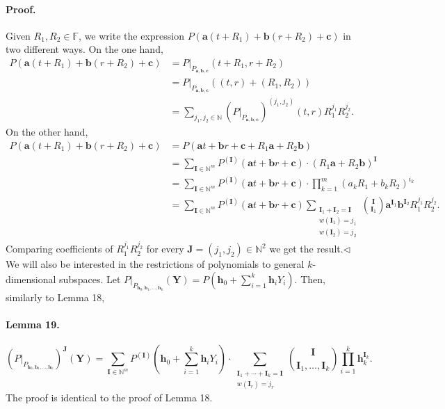 \paragraph{Proof.} Given $R_1,R_2\in\mathbb F$, we write the expression $P(\boldsymbol a(t+R_1)+\boldsymbol b(r+R_2)+\boldsymbol c)$ in two different ways. On the one hand,
\begin{align*}
P(\boldsymbol a(t+R_1)+\boldsymbol b(r+R_2)+\boldsymbol c)
&=P|_{P_{\boldsymbol a,\boldsymbol b,\boldsymbol c}}(t+R_1,r+R_2)\\
&=P|_{P_{\boldsymbol a,\boldsymbol b,\boldsymbol c}}((t,r)+(R_1,R_2))\\
&=\sum_{j_1,j_2\in\mathbb N}(P|_{P_{\boldsymbol a,\boldsymbol b,\boldsymbol c}})^{(j_1,j_2)}(t,r)R_1^{j_1}R_2^{j_2}.
\end{align*}
On the other hand,
\begin{align*}
P(\boldsymbol a(t+R_1)+\boldsymbol b(r+R_2)+\boldsymbol c)
&=P(\boldsymbol at+\boldsymbol br+\boldsymbol c+R_1\boldsymbol a+R_2\boldsymbol b)\\
&=\sum_{\boldsymbol I\in\mathbb N^m}P^{(\boldsymbol I)}(\boldsymbol at+\boldsymbol br+\boldsymbol c)\cdot(R_1\boldsymbol a+R_2\boldsymbol b)^{\boldsymbol I}\\
&=\sum_{\boldsymbol I\in\mathbb N^m}P^{(\boldsymbol I)}(\boldsymbol at+\boldsymbol br+\boldsymbol c)\cdot\prod_{k=1}^m(a_kR_1+b_kR_2)^{i_k}\\
&=\sum_{\boldsymbol I\in\mathbb N^m}P^{(\boldsymbol I)}(\boldsymbol at+\boldsymbol br+\boldsymbol c)
\sum_{\substack{\boldsymbol I_1+\boldsymbol I_2=\boldsymbol I\\w(\boldsymbol I_1)=j_1\\w(\boldsymbol I_2)=j_2}}\binom{\boldsymbol I}{\boldsymbol I_1}\boldsymbol a^{\boldsymbol I_1}\boldsymbol b^{\boldsymbol I_2}R_1^{j_1}R_2^{j_2}.
\end{align*}
Comparing coefficients of $R_1^{j_1}R_2^{j_2}$ for every $\boldsymbol J=(j_1,j_2)\in\mathbb N^2$ we get the result.\hfill$\triangleleft$
We will also be interested in the restrictions of polynomials to general $k$-dimensional subspaces. Let $P|_{P_{\boldsymbol h_0,\boldsymbol h_1,\ldots,\boldsymbol h_k}}(\boldsymbol Y)=P(\boldsymbol h_0+\sum_{i=1}^k\boldsymbol h_iY_i)$. Then, similarly to Lemma 18,
\paragraph{Lemma 19.}
\[(P|_{P_{\boldsymbol h_0,\boldsymbol h_1,\ldots,\boldsymbol h_k}})^{\boldsymbol J}(\boldsymbol Y)=\sum_{\boldsymbol I\in\mathbb N^m}P^{(\boldsymbol I)}\left(\boldsymbol h_0+\sum_{i=1}^k\boldsymbol h_iY_i\right)\cdot\sum_{\substack{\boldsymbol I_1+\cdots+\boldsymbol I_k=\boldsymbol I\\w(\boldsymbol I_r)=j_r}}\binom{\boldsymbol I}{\boldsymbol I_1,\ldots,\boldsymbol I_k}\prod_{i=1}^k\boldsymbol h_k^{\boldsymbol I_k}.\]
The proof is identical to the proof of Lemma 18.
